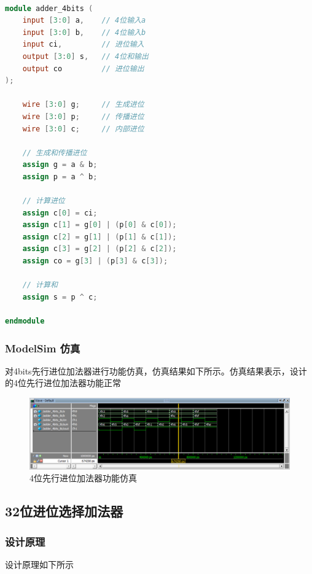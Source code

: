 \documentclass[12pt,hyperref,a4paper,UTF8]{ctexart}
\begin{document}
\begin{lstlisting}[language=Verilog]

module adder_4bits (
    input [3:0] a,    // 4位输入a
    input [3:0] b,    // 4位输入b
    input ci,         // 进位输入
    output [3:0] s,   // 4位和输出
    output co         // 进位输出
);

    wire [3:0] g;     // 生成进位
    wire [3:0] p;     // 传播进位
    wire [3:0] c;     // 内部进位

    // 生成和传播进位
    assign g = a & b;
    assign p = a ^ b;

    // 计算进位
    assign c[0] = ci;
    assign c[1] = g[0] | (p[0] & c[0]);
    assign c[2] = g[1] | (p[1] & c[1]);
    assign c[3] = g[2] | (p[2] & c[2]);
    assign co = g[3] | (p[3] & c[3]);

    // 计算和
    assign s = p ^ c;

endmodule


\end{lstlisting}

\subsubsection{ModelSim 仿真}

对4bits先行进位加法器进行功能仿真，仿真结果如下所示。仿真结果表示，设计的4位先行进位加法器功能正常

  \begin{figure}[H]
      \centering
      \includegraphics[width =1.0\textwidth]{figures/fig/Snipaste_2024-09-23_08-50-18.png}
      \caption{4位先行进位加法器功能仿真}
      \label{fig:enter-label}
  \end{figure}

  \newpage

\subsection{32位进位选择加法器}
\subsubsection{设计原理}
  设计原理如下所示
\end{document}
